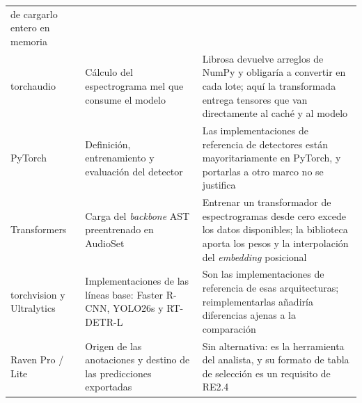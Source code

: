 \begin{table}[htbp]
\begin{tabular}{@{}L{3.1cm}L{4.6cm}L{6.3cm}@{}}
        de cargarlo entero en memoria                                                                                                                              \\
        \addlinespace
        torchaudio \citep{yang_torchaudio_2022} &
        Cálculo del espectrograma mel que consume el modelo                 &
        Librosa devuelve arreglos de NumPy y obligaría a convertir en cada lote;
        aquí la transformada entrega tensores que van directamente al caché
        y al modelo                                                                                                                                               \\
        \addlinespace
        PyTorch \citep{paszke_pytorch_2019} &
        Definición, entrenamiento y evaluación del detector                 &
        Las implementaciones de referencia de detectores están mayoritariamente
        en PyTorch, y portarlas a otro marco no se justifica                                                                                                       \\
        \addlinespace
        Transformers \citep{wolf_transformers_2020} &
        Carga del \textit{backbone} AST preentrenado en AudioSet            &
        Entrenar un transformador de espectrogramas desde cero excede los datos
        disponibles; la biblioteca aporta los pesos y la interpolación del
        \textit{embedding} posicional                                                                                                                              \\
        \addlinespace
        torchvision \citep{torchvision_2026} y Ultralytics \citep{ultralytics_2026} &
        Implementaciones de las líneas base: Faster R-CNN, YOLO26s y RT-DETR-L &
        Son las implementaciones de referencia de esas arquitecturas;
        reimplementarlas añadiría diferencias ajenas a la comparación                                                                                             \\
        \addlinespace
        Raven Pro / Lite \citep{raven_pro} &
        Origen de las anotaciones y destino de las predicciones exportadas  &
        Sin alternativa: es la herramienta del analista, y su formato de tabla de
        selección es un requisito de RE2.4                                                                                              \\
        \bottomrule
    \end{tabular}
\end{table}

